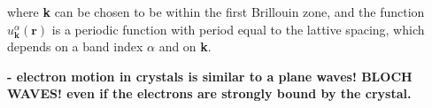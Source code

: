 where \textbf{k} can be chosen to be within the first Brillouin zone, and the function $u_\textbf{k}^\alpha (\textbf{r})$ is a periodic function with period equal to the lattive spacing, which depends on a band index $\alpha$ and on \textbf{k}.

\textbf{- electron motion in crystals is similar to a plane waves! BLOCH WAVES! even if the electrons are strongly bound by the crystal.}
